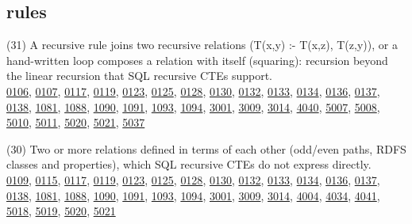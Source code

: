 \documentclass[10pt]{article}
\begin{document}
\subsection*{rules}
\begin{description}[leftmargin=1.2em,itemsep=2pt]
\item[\texttt{nonlinear-recursion}\label{tag:nonlinear-recursion}] (31) A recursive rule joins two recursive relations (T(x,y) :- T(x,z), T(z,y)), or a hand-written loop composes a relation with itself (squaring): recursion beyond the linear recursion that SQL recursive CTEs support.\\ {\small \hyperref[case:Example0106]{0106}, \hyperref[case:Example0107]{0107}, \hyperref[case:Example0117]{0117}, \hyperref[case:Example0119]{0119}, \hyperref[case:Example0123]{0123}, \hyperref[case:Example0125]{0125}, \hyperref[case:Example0128]{0128}, \hyperref[case:Example0130]{0130}, \hyperref[case:Example0132]{0132}, \hyperref[case:Example0133]{0133}, \hyperref[case:Example0134]{0134}, \hyperref[case:Example0136]{0136}, \hyperref[case:Example0137]{0137}, \hyperref[case:Example0138]{0138}, \hyperref[case:Example1081]{1081}, \hyperref[case:Example1088]{1088}, \hyperref[case:Example1090]{1090}, \hyperref[case:Example1091]{1091}, \hyperref[case:Example1093]{1093}, \hyperref[case:Example1094]{1094}, \hyperref[case:Example3001]{3001}, \hyperref[case:Example3009]{3009}, \hyperref[case:Example3014]{3014}, \hyperref[case:Example4040]{4040}, \hyperref[case:Example5007]{5007}, \hyperref[case:Example5008]{5008}, \hyperref[case:Example5010]{5010}, \hyperref[case:Example5011]{5011}, \hyperref[case:Example5020]{5020}, \hyperref[case:Example5021]{5021}, \hyperref[case:Example5037]{5037}}
\item[\texttt{mutual-recursion}\label{tag:mutual-recursion}] (30) Two or more relations defined in terms of each other (odd/even paths, RDFS classes and properties), which SQL recursive CTEs do not express directly.\\ {\small \hyperref[case:Example0109]{0109}, \hyperref[case:Example0115]{0115}, \hyperref[case:Example0117]{0117}, \hyperref[case:Example0119]{0119}, \hyperref[case:Example0123]{0123}, \hyperref[case:Example0125]{0125}, \hyperref[case:Example0128]{0128}, \hyperref[case:Example0130]{0130}, \hyperref[case:Example0132]{0132}, \hyperref[case:Example0133]{0133}, \hyperref[case:Example0134]{0134}, \hyperref[case:Example0136]{0136}, \hyperref[case:Example0137]{0137}, \hyperref[case:Example0138]{0138}, \hyperref[case:Example1081]{1081}, \hyperref[case:Example1088]{1088}, \hyperref[case:Example1090]{1090}, \hyperref[case:Example1091]{1091}, \hyperref[case:Example1093]{1093}, \hyperref[case:Example1094]{1094}, \hyperref[case:Example3001]{3001}, \hyperref[case:Example3009]{3009}, \hyperref[case:Example3014]{3014}, \hyperref[case:Example4004]{4004}, \hyperref[case:Example4034]{4034}, \hyperref[case:Example4041]{4041}, \hyperref[case:Example5018]{5018}, \hyperref[case:Example5019]{5019}, \hyperref[case:Example5020]{5020}, \hyperref[case:Example5021]{5021}}

\end{description}
\end{document}
